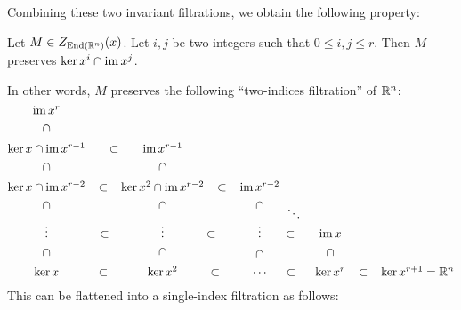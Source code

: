 \documentclass[english]{article}
\begin{document}
Combining these two invariant filtrations, we obtain the following property:
\begin{lemma}
    Let $M\in Z_{\operatorname{End}(\mathbb{R}^n)} (x)$.
    Let $i, j$ be two integers such that $0\leqslant i,j \leqslant r$. 
    Then $M$ preserves $\ker x^i\cap \operatorname{im} x^j$. 
\end{lemma}%
In other words, $M$ preserves the following \enquote{two-indices filtration} of $\mathbb{R}^n$:
\begin{equation}\label{diagno:bidrapeau}
	\begin{tikzcd}[cramped]
		\im x^{r}
			\ar[d, phantom, "\subset" sloped]
	&	
	&
	&
	&
	\\
%	
	\ker x \cap \im x^{r-1}
			\ar[d, phantom, "\subset" sloped]
			\ar[r, phantom, "\subset"]
	&
	\im x^{r-1}
			\ar[d, phantom, "\subset" sloped]
	&
	&
	&
	\\
%	
	\ker x \cap \im x^{r-2}
			\ar[d, phantom, "\subset" sloped]
			\ar[r, phantom, "\subset"]
	&
	\ker x^2 \cap \im x^{r-2}
			\ar[d, phantom, "\subset" sloped]
			\ar[r, phantom, "\subset"]
	&
	\im x^{r-2}
			\ar[d, phantom, "\subset" sloped]
			\ar[rd, phantom, "\ddots"]
	&
	&
	\\
%	
	\vdots
			\ar[d, phantom, "\subset" sloped]	
			\ar[r, phantom, "\subset"]
	&
	\vdots
			\ar[d, phantom, "\subset" sloped]	
			\ar[r, phantom, "\subset"]
	&
	\vdots
			\ar[d, phantom, "\subset" sloped]	
			\ar[r, phantom, "\subset"]
	&
	\im x
			\ar[d, phantom, "\subset" sloped]
	&
	\\
%	
	\ker x
			\ar[r, phantom, "\subset"]
	&
	\ker x^2
			\ar[r, phantom, "\subset"]
	&
		\cdots 
			\ar[r, phantom, "\subset"]
	&
	\ker x^{r}
			\ar[r, phantom, "\subset"]
	&
	\ker x^{r+1} = \setR^n
	\end{tikzcd}	
\end{equation}
%
This can be flattened into a single-index filtration as follows:
\end{document}
